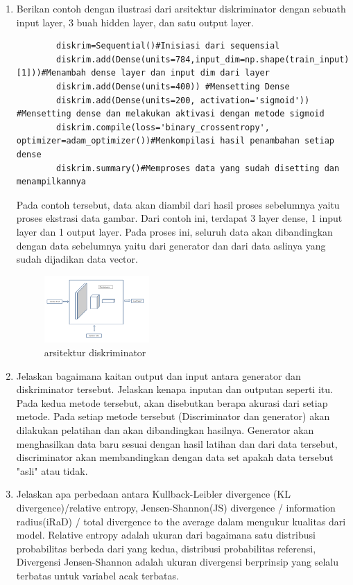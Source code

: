 \begin{enumerate}
    \item Berikan contoh dengan ilustrasi dari arsitektur diskriminator dengan sebuath input layer, 3 buah hidden layer, dan satu output layer.
    \hfill\break
    \begin{verbatim}
        diskrim=Sequential()#Inisiasi dari sequensial
        diskrim.add(Dense(units=784,input_dim=np.shape(train_input)[1]))#Menambah dense layer dan input dim dari layer
        diskrim.add(Dense(units=400)) #Mensetting Dense
        diskrim.add(Dense(units=200, activation='sigmoid')) #Mensetting dense dan melakukan aktivasi dengan metode sigmoid
        diskrim.compile(loss='binary_crossentropy', optimizer=adam_optimizer())#Menkompilasi hasil penambahan setiap dense
        diskrim.summary()#Memproses data yang sudah disetting dan menampilkannya
    \end{verbatim}
    Pada contoh tersebut, data akan diambil dari hasil proses sebelumnya yaitu proses ekstrasi data gambar. Dari contoh ini, terdapat 3 layer dense, 1 input layer dan 1 output layer. Pada proses ini, seluruh data akan dibandingkan dengan data sebelumnya yaitu dari generator dan dari data aslinya yang sudah dijadikan data vector. 
    \begin{figure}[H]
	    \centering
	    \includegraphics[width=4cm]{figures/1174096/tugas8/t10.PNG}
	    \caption{arsitektur diskriminator}
    \end{figure}

    \item Jelaskan bagaimana kaitan output dan input antara generator dan diskriminator tersebut. Jelaskan kenapa inputan dan outputan seperti itu.
    \hfill\break
    Pada kedua metode tersebut, akan disebutkan berapa akurasi dari setiap metode. Pada setiap metode tersebut (Discriminator dan generator) akan dilakukan pelatihan dan akan dibandingkan hasilnya. Generator akan menghasilkan data baru sesuai dengan hasil latihan dan dari data tersebut, discriminator akan membandingkan dengan data set apakah data tersebut "asli" atau tidak. 

    \item Jelaskan apa perbedaan antara Kullback-Leibler divergence (KL divergence)/relative entropy, Jensen-Shannon(JS) divergence / information radius(iRaD) / total divergence to the average dalam mengukur kualitas dari model.
    \hfill\break
    Relative entropy adalah ukuran dari bagaimana satu distribusi probabilitas berbeda dari yang kedua, distribusi probabilitas referensi, Divergensi Jensen-Shannon adalah ukuran divergensi berprinsip yang selalu terbatas untuk variabel acak terbatas.
    

\end{enumerate}
